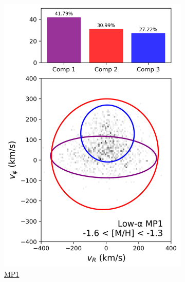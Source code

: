 \documentclass[a4paper,12pt]{article}
\begin{document}
\begin{figure}[H]
\begin{subfigure}{0.24\linewidth}
    \includegraphics[width=\linewidth]{../figures/gmm_mp1_low_alpha_k4.png}
    \caption{\href{https://raw.githack.com/raunaq-rai/Disentangling-the-Milky-Way-using-GMM/main/figures/MP1_low____-1.6\%5BM_H\%5D-1.3.html}{MP1}}
    \label{fig:gmm_mp1_lo}
  \end{subfigure}\hfill
  \begin{subfigure}{0.24\linewidth}
    \centering

\end{subfigure}
\end{figure}
\end{document}
